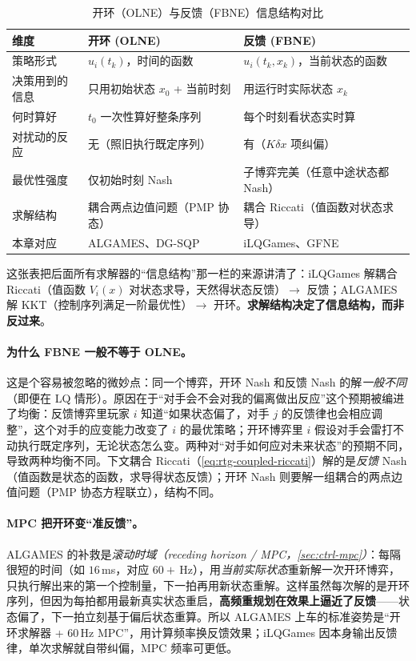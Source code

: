 \begin{table}[H]\centering\small
\caption{开环（OLNE）与反馈（FBNE）信息结构对比}
\label{tab:rtg-olne-fbne}
\begin{tabular}{p{} p{} p{}}
\toprule
维度 & 开环 (OLNE) & 反馈 (FBNE) \\
\midrule
策略形式 & $u_i(t_k)$，时间的函数 & $u_i(t_k,x_k)$，当前状态的函数 \\
决策用到的信息 & 只用初始状态 $x_0$ + 当前时刻 & 用运行时实际状态 $x_k$ \\
何时算好 & $t_0$ 一次性算好整条序列 & 每个时刻看状态实时算 \\
对扰动的反应 & 无（照旧执行既定序列） & 有（$K\delta x$ 项纠偏） \\
最优性强度 & 仅初始时刻 Nash & 子博弈完美（任意中途状态都 Nash） \\
求解结构 & 耦合两点边值问题（PMP 协态） & 耦合 Riccati（值函数对状态求导） \\
本章对应 & ALGAMES、DG-SQP & iLQGames、GFNE \\
\bottomrule
\end{tabular}
\end{table}

\noindent 这张表把后面所有求解器的“信息结构”那一栏的来源讲清了：iLQGames 解耦合 Riccati（值函数 $V_i(x)$ 对状态求导，天然得状态反馈）$\to$ 反馈；ALGAMES 解 KKT（控制序列满足一阶最优性）$\to$ 开环。\textbf{求解结构决定了信息结构，而非反过来}。

\paragraph{为什么 FBNE 一般不等于 OLNE。}
这是个容易被忽略的微妙点：同一个博弈，开环 Nash 和反馈 Nash 的解\emph{一般不同}（即便在 LQ 情形）。原因在于“对手会不会对我的偏离做出反应”这个预期被编进了均衡：反馈博弈里玩家 $i$ 知道“如果状态偏了，对手 $j$ 的反馈律也会相应调整”，这个对手的应变能力改变了 $i$ 的最优策略；开环博弈里 $i$ 假设对手会雷打不动执行既定序列，无论状态怎么变。两种对“对手如何应对未来状态”的预期不同，导致两种均衡不同。下文耦合 Riccati（\cref{eq:rtg-coupled-riccati}）解的是\emph{反馈} Nash（值函数是状态的函数，求导得状态反馈）；开环 Nash 则要解一组耦合的两点边值问题（PMP 协态方程联立），结构不同。

\paragraph{MPC 把开环变“准反馈”。}
ALGAMES 的补救是\emph{滚动时域（receding horizon / MPC，\cref{sec:ctrl-mpc}）}：每隔很短的时间（如 $16$\,ms，对应 $60+$\,Hz），用\emph{当前实际状态}重新解一次开环博弈，只执行解出来的第一个控制量，下一拍再用新状态重解。这样虽然每次解的是开环序列，但因为每拍都用最新真实状态重启，\textbf{高频重规划在效果上逼近了反馈}——状态偏了，下一拍立刻基于偏后状态重算。所以 ALGAMES 上车的标准姿势是“开环求解器 + $60$\,Hz MPC”，用计算频率换反馈效果；iLQGames 因本身输出反馈律，单次求解就自带纠偏，MPC 频率可更低。

